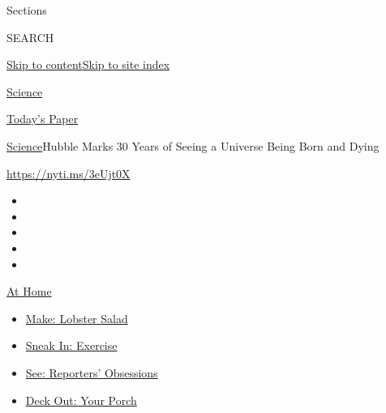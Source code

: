 Sections

SEARCH

\protect\hyperlink{site-content}{Skip to
content}\protect\hyperlink{site-index}{Skip to site index}

\href{https://www.nytimes3xbfgragh.onion/section/science}{Science}

\href{https://myaccount.nytimes3xbfgragh.onion/auth/login?response_type=cookie\&client_id=vi}{}

\href{https://www.nytimes3xbfgragh.onion/section/todayspaper}{Today's
Paper}

\href{/section/science}{Science}\textbar{}Hubble Marks 30 Years of
Seeing a Universe Being Born and Dying

\url{https://nyti.ms/3eUjt0X}

\begin{itemize}
\item
\item
\item
\item
\item
\end{itemize}

\href{https://www.nytimes3xbfgragh.onion/spotlight/at-home?action=click\&pgtype=Article\&state=default\&region=TOP_BANNER\&context=at_home_menu}{At
Home}

\begin{itemize}
\tightlist
\item
  \href{https://www.nytimes3xbfgragh.onion/2020/08/14/dining/lobster-salad-recipe.html?action=click\&pgtype=Article\&state=default\&region=TOP_BANNER\&context=at_home_menu}{Make:
  Lobster Salad}
\item
  \href{https://www.nytimes3xbfgragh.onion/2020/08/15/at-home/coronavirus-at-home-quick-exercises.html?action=click\&pgtype=Article\&state=default\&region=TOP_BANNER\&context=at_home_menu}{Sneak
  In: Exercise}
\item
  \href{https://www.nytimes3xbfgragh.onion/interactive/2020/at-home/even-more-reporters-editors-diaries-lists-recommendations.html?action=click\&pgtype=Article\&state=default\&region=TOP_BANNER\&context=at_home_menu}{See:
  Reporters' Obsessions}
\item
  \href{https://www.nytimes3xbfgragh.onion/2020/08/15/at-home/coronavirus-fall-patio-furniture.html?action=click\&pgtype=Article\&state=default\&region=TOP_BANNER\&context=at_home_menu}{Deck
  Out: Your Porch}
\end{itemize}

